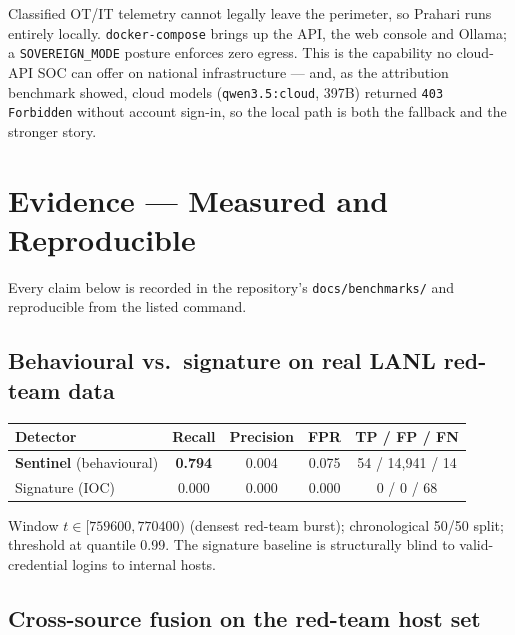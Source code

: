 \documentclass[11pt,a4paper]{article}
\begin{document}
Classified OT/IT telemetry cannot legally leave the perimeter, so Prahari runs entirely
locally. \texttt{docker-compose} brings up the API, the web console and Ollama; a
\texttt{SOVEREIGN\_MODE} posture enforces zero egress. This is the capability no cloud-API SOC
can offer on national infrastructure — and, as the attribution benchmark showed, cloud models
(\texttt{qwen3.5:cloud}, 397B) returned \texttt{403 Forbidden} without account sign-in, so the
local path is both the fallback and the stronger story.

\section{Evidence — Measured and Reproducible}

Every claim below is recorded in the repository's \texttt{docs/benchmarks/} and reproducible
from the listed command.

\subsection{Behavioural vs.\ signature on real LANL red-team data}

\begin{center}
\begin{tabularx}{\linewidth}{@{}L{4.2cm} c c c c@{}}
\toprule
\textbf{Detector} & \textbf{Recall} & \textbf{Precision} & \textbf{FPR} & \textbf{TP / FP / FN} \\
\midrule
\textbf{Sentinel} (behavioural) & \textbf{0.794} & 0.004 & 0.075 & 54 / 14{,}941 / 14 \\
Signature (IOC)                 & 0.000 & 0.000 & 0.000 & 0 / 0 / 68 \\
\bottomrule
\end{tabularx}
\end{center}
{\small Window $t\in[759600,770400)$ (densest red-team burst); chronological 50/50 split;
threshold at quantile 0.99. The signature baseline is structurally blind to valid-credential
logins to internal hosts.\par}

\subsection{Cross-source fusion on the red-team host set}
\end{document}
